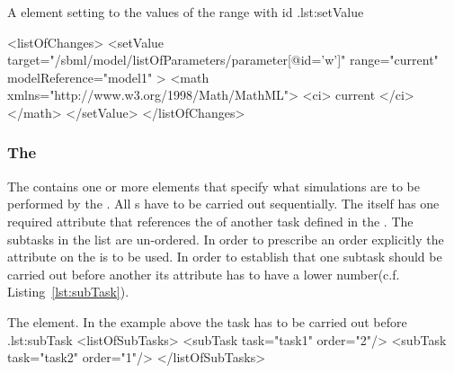 \begin{myXmlLst}{A  element setting  to the values of the range with id .}{lst:setValue}

  <listOfChanges>
    <setValue target="/sbml/model/listOfParameters/parameter[@id='w']" range="current" modelReference="model1" > 
      <math xmlns="http://www.w3.org/1998/Math/MathML"> 
         <ci> current </ci> 
      </math> 
    </setValue> 
  </listOfChanges>
\end{myXmlLst}


\subsubsection{The }
\label{class:subTasks}
The  contains one or more  elements that specify what simulations are to be performed by the . All s have to be carried out sequentially. The  itself has one required attribute  that references the  of another task defined in the . The subtasks in the list are un-ordered.  In order to prescribe an order explicitly the  attribute on the  is to be used. In order to establish that one subtask should be carried out before another its  attribute has to have a lower number(c.f. Listing~\ref{lst:subTask}).

\begin{myXmlLst}{The  element. In the example above the task  has to be carried out before .}{lst:subTask}
  <listOfSubTasks>
    <subTask task="task1" order="2"/> 
    <subTask task="task2" order="1"/> 
  </listOfSubTasks>
\end{myXmlLst}

 


